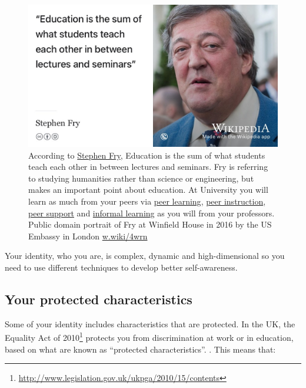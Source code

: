 \documentclass[
]{book}
\begin{document}
\begin{figure}

{\centering \includegraphics[width=1\linewidth]{images/fry-lecture} 

}

\caption{According to \href{https://en.wikipedia.org/wiki/Stephen_Fry}{Stephen Fry}, Education is the sum of what students teach each other in between lectures and seminars. \citep{frychronicles} Fry is referring to studying humanities rather than science or engineering, but makes an important point about education. At University you will learn as much from your peers via \href{https://en.wikipedia.org/wiki/Peer_learning}{peer learning}, \href{https://en.wikipedia.org/wiki/Peer_instruction}{peer instruction}, \href{http://www.peersupport.manchester.ac.uk/}{peer support} and \href{https://en.wikipedia.org/wiki/Informal_learning}{informal learning} as you will from your professors. Public domain portrait of Fry at Winfield House in 2016 by the US Embassy in London \href{https://w.wiki/4wrn}{w.wiki/4wrn}}\label{fig:stephen-fry-lecture-fig}
\end{figure}



Your identity, who you are, is complex, dynamic and high-dimensional so you need to use different techniques to develop better self-awareness.

\hypertarget{protected}{%
\subsection{Your protected characteristics}\label{protected}}

Some of your identity includes characteristics that are protected. In the UK, the Equality Act of 2010\footnote{\url{http://www.legislation.gov.uk/ukpga/2010/15/contents}} protects you from discrimination at work or in education, based on what are known as ``protected characteristics''. \citep{equality}. This means that:
\end{document}
